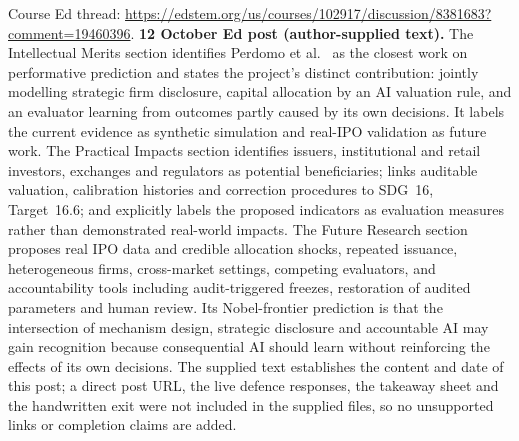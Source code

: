 Course Ed thread: \url{https://edstem.org/us/courses/102917/discussion/8381683?comment=19460396}. \textbf{12 October Ed post (author-supplied text).} The Intellectual Merits section identifies Perdomo et al.~\cite{perdomo2020} as the closest work on performative prediction and states the project's distinct contribution: jointly modelling strategic firm disclosure, capital allocation by an AI valuation rule, and an evaluator learning from outcomes partly caused by its own decisions. It labels the current evidence as synthetic simulation and real-IPO validation as future work. The Practical Impacts section identifies issuers, institutional and retail investors, exchanges and regulators as potential beneficiaries; links auditable valuation, calibration histories and correction procedures to SDG~16, Target~16.6; and explicitly labels the proposed indicators as evaluation measures rather than demonstrated real-world impacts. The Future Research section proposes real IPO data and credible allocation shocks, repeated issuance, heterogeneous firms, cross-market settings, competing evaluators, and accountability tools including audit-triggered freezes, restoration of audited parameters and human review. Its Nobel-frontier prediction is that the intersection of mechanism design, strategic disclosure and accountable AI may gain recognition because consequential AI should learn without reinforcing the effects of its own decisions. The supplied text establishes the content and date of this post; a direct post URL, the live defence responses, the takeaway sheet and the handwritten exit were not included in the supplied files, so no unsupported links or completion claims are added.

